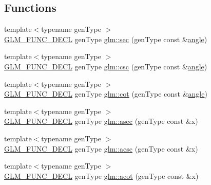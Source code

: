 \subsection*{Functions}
\begin{DoxyCompactItemize}
\item 
{\footnotesize template$<$typename gen\+Type $>$ }\\\hyperlink{setup_8hpp_ab2d052de21a70539923e9bcbf6e83a51}{G\+L\+M\+\_\+\+F\+U\+N\+C\+\_\+\+D\+E\+CL} gen\+Type \hyperlink{group__gtc__reciprocal_gabb6829a472da1cc94d88afa6396bed1f}{glm\+::sec} (gen\+Type const \&\hyperlink{group__gtc__quaternion_ga23a3fc7ada5bbb665ff84c92c6e0542c}{angle})
\item 
{\footnotesize template$<$typename gen\+Type $>$ }\\\hyperlink{setup_8hpp_ab2d052de21a70539923e9bcbf6e83a51}{G\+L\+M\+\_\+\+F\+U\+N\+C\+\_\+\+D\+E\+CL} gen\+Type \hyperlink{group__gtc__reciprocal_ga5df75de99f63e854087a06f538907b2c}{glm\+::csc} (gen\+Type const \&\hyperlink{group__gtc__quaternion_ga23a3fc7ada5bbb665ff84c92c6e0542c}{angle})
\item 
{\footnotesize template$<$typename gen\+Type $>$ }\\\hyperlink{setup_8hpp_ab2d052de21a70539923e9bcbf6e83a51}{G\+L\+M\+\_\+\+F\+U\+N\+C\+\_\+\+D\+E\+CL} gen\+Type \hyperlink{group__gtc__reciprocal_ga2f49e28c2634ae1a212e2fc38c42ad42}{glm\+::cot} (gen\+Type const \&\hyperlink{group__gtc__quaternion_ga23a3fc7ada5bbb665ff84c92c6e0542c}{angle})
\item 
{\footnotesize template$<$typename gen\+Type $>$ }\\\hyperlink{setup_8hpp_ab2d052de21a70539923e9bcbf6e83a51}{G\+L\+M\+\_\+\+F\+U\+N\+C\+\_\+\+D\+E\+CL} gen\+Type \hyperlink{group__gtc__reciprocal_gac9761980e09149002a466ca131a4bcac}{glm\+::asec} (gen\+Type const \&x)
\item 
{\footnotesize template$<$typename gen\+Type $>$ }\\\hyperlink{setup_8hpp_ab2d052de21a70539923e9bcbf6e83a51}{G\+L\+M\+\_\+\+F\+U\+N\+C\+\_\+\+D\+E\+CL} gen\+Type \hyperlink{group__gtc__reciprocal_ga135e8f6b36bb85b5f7d8067e6b890e4d}{glm\+::acsc} (gen\+Type const \&x)
\item 
{\footnotesize template$<$typename gen\+Type $>$ }\\\hyperlink{setup_8hpp_ab2d052de21a70539923e9bcbf6e83a51}{G\+L\+M\+\_\+\+F\+U\+N\+C\+\_\+\+D\+E\+CL} gen\+Type \hyperlink{group__gtc__reciprocal_ga97d029f989f849b62915b068c264246b}{glm\+::acot} (gen\+Type const \&x)
\item 

\end{DoxyCompactItemize}
